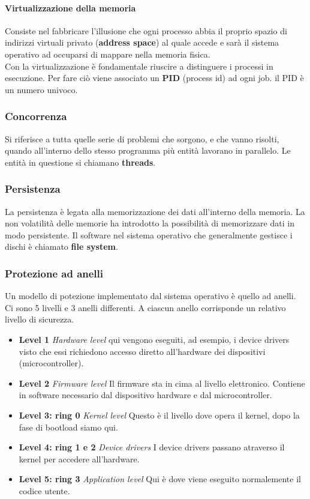\documentclass[12pt, letterpaper]{article}
\begin{document}
				\paragraph{Virtualizzazione della memoria} Consiste nel fabbricare l'illusione che ogni processo abbia il proprio spazio di indirizzi virtuali privato (\textbf{address space}) al quale accede e sarà il sistema operativo ad occuparsi di mappare nella memoria fisica.\\
						
				Con la virtualizzazione è fondamentale riuscire a distinguere i processi in esecuzione. Per fare ciò viene associato un \textbf{PID} (process id) ad ogni job. il PID è un numero univoco.
		
			\subsubsection{Concorrenza} Si riferisce a tutta quelle serie di problemi che sorgono, e che vanno risolti, quando all'interno dello stesso programma più entità lavorano in parallelo. Le entità in questione si chiamano \textbf{threads}.
			
			\subsubsection{Persistenza} La persistenza è legata alla memorizzazione dei dati all'interno della memoria. La non volatilità delle memorie ha introdotto la possibilità di memorizzare dati in modo persistente. Il software nel sistema operativo che generalmente gestisce i dischi è chiamato \textbf{file system}.
			
			\subsubsection{Protezione ad anelli}
				Un modello di potezione implementato dal sistema operativo è quello ad anelli. Ci sono 5 livelli e 3 anelli differenti. A ciascun anello corrisponde un relativo livello di sicurezza. 
				\begin{itemize}
					\item \textbf{Level 1}\textit{ Hardware level} qui vengono eseguiti, ad esempio, i device drivers visto che essi richiedono accesso diretto all'hardware dei dispositivi (microcontroller).
					\item \textbf{Level 2}\textit{ Firmware level} Il  firmware sta in cima al livello elettronico. Contiene in software necessario dal dispositivo hardware e dal microcontroller. 
					\item \textbf{Level 3: ring 0}\textit{ Kernel level} Questo è il livello dove opera il kernel, dopo la fase di bootload siamo qui.
					\item \textbf{Level 4: ring 1 e 2}\textit{ Device drivers} I device drivers passano atraverso il kernel per accedere all'hardware.
					\item \textbf{Level 5: ring 3}\textit{ Application level} Qui è dove viene eseguito normalemente il codice utente.
				\end{itemize}
						
\end{document}
